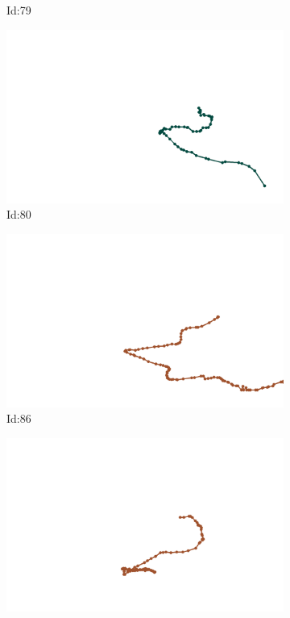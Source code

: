 \documentclass[12pt,twoside]{report}
\begin{document}
\begin{figure}
\begin{subfigure}[b]{0.20\textwidth}
\caption{Id:79}
\end{subfigure}
\begin{subfigure}[b]{0.20\textwidth}
\centering
\includegraphics[width=\textwidth]{../trajectories/80.png}
\caption{Id:80}
\end{subfigure}
\begin{subfigure}[b]{0.20\textwidth}
\centering
\includegraphics[width=\textwidth]{../trajectories/86.png}
\caption{Id:86}
\end{subfigure}
\begin{subfigure}[b]{0.20\textwidth}
\centering
\includegraphics[width=\textwidth]{../trajectories/107.png}

\end{subfigure}
\end{figure}
\end{document}
